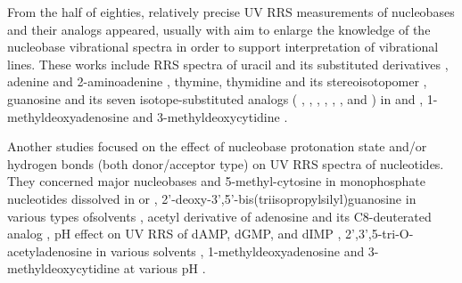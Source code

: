From the half of eighties, relatively precise UV RRS measurements of
nucleobases and their analogs appeared, usually with aim to enlarge the
knowledge of the nucleobase vibrational spectra in order to support
interpretation of vibrational lines.
These works include RRS spectra of uracil and its  substituted
derivatives
\parencite{Ghomi1986},
adenine and 2-aminoadenine
\parencite{Dhaouadi1994},
thymine, thymidine and its stereoisotopomer
\parencite{Tsuboi1997},
guanosine and its seven isotope-substituted analogs
(%
	,
	,
	,
	,
	,
	,
	and %
)
in  and 
\parencite{%
	Toyama1999,%
	Toyama2002%
},
1-methyldeoxyadenosine and 3-methyldeoxycytidine
\parencite{Jayanth2011}.

Another studies focused on the effect of nucleobase protonation state and/or
hydrogen bonds (both donor/acceptor type) on UV RRS spectra of nucleotides.
They concerned major nucleobases and 5-methyl-cytosine in monophosphate
nucleotides dissolved in  or 
\parencite{Gfrorer1991},
2'-deoxy-3',5'-bis(triisopropylsilyl)\allowbreak{}guanosine
in various types ofsolvents
\parencite{Toyama1996},
acetyl derivative of adenosine and its C8-deuterated analog
\parencite{Fujimoto1998},
pH effect on UV RRS of dAMP, dGMP, and dIMP
\parencite{Sokolov2000},
2',3',5-tri-O-acetyladenosine in various solvents
\parencite{Toyama2005a},
1-methyldeoxyadenosine and 3-methyldeoxycytidine at various pH
\parencite{Jayanth2011}.
